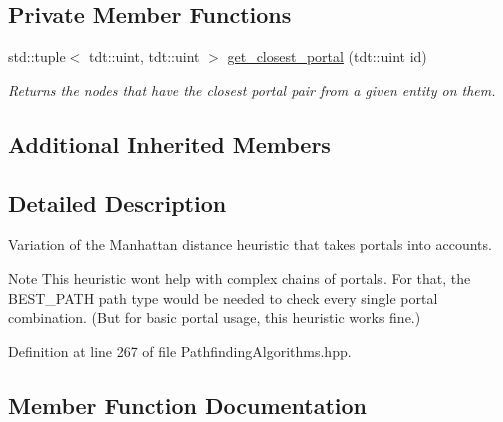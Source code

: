 \subsection*{Private Member Functions}
\begin{DoxyCompactItemize}
\item 
std\+::tuple$<$ tdt\+::uint, tdt\+::uint $>$ \hyperlink{structutil_1_1heuristic_1_1_p_o_r_t_a_l___h_e_u_r_i_s_t_i_c_ab49ded73b51452534aaea1383a44b9db}{get\+\_\+closest\+\_\+portal} (tdt\+::uint id)
\begin{DoxyCompactList}\small\item\em Returns the nodes that have the closest portal pair from a given entity on them. \end{DoxyCompactList}\end{DoxyCompactItemize}
\subsection*{Additional Inherited Members}


\subsection{Detailed Description}
Variation of the Manhattan distance heuristic that takes portals into accounts. 

\begin{DoxyNote}{Note}
This heuristic won\textquotesingle{}t help with complex chains of portals. For that, the B\+E\+S\+T\+\_\+\+P\+A\+TH path type would be needed to check every single portal combination. (But for basic portal usage, this heuristic works fine.) 
\end{DoxyNote}


Definition at line 267 of file Pathfinding\+Algorithms.\+hpp.



\subsection{Member Function Documentation}
